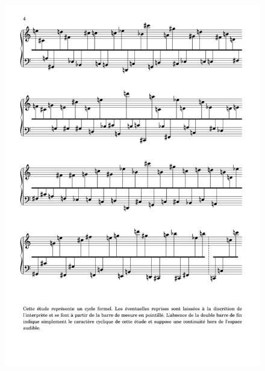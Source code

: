  \begin{figure}[H]
\begin{center}
\includegraphics[width=\textwidth]{mp/img/a-3.png}
\end{center}
\end{figure}

